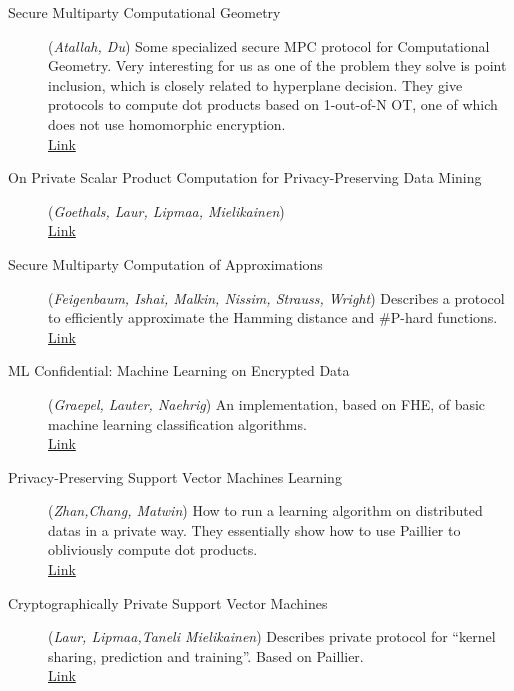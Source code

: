 \documentclass[11pt]{article}
\begin{document}
\begin{description}
	\item[Secure Multiparty Computational Geometry] (\emph{Atallah, Du}) Some specialized secure MPC protocol for Computational Geometry. Very interesting for us as one of the problem they solve is point inclusion, which is closely related to hyperplane decision. They give protocols to compute dot products based on 1-out-of-N OT, one of which does not use homomorphic encryption.
	\\ \href{https://www.cerias.purdue.edu/assets/pdf/bibtex_archive/2001-48.pdf}{Link} 
	
	\item [On Private Scalar Product Computation for Privacy-Preserving Data Mining](\emph{Goethals, Laur, Lipmaa, Mielikainen})
	\\ \href{http://eprints.pascal-network.org/archive/00000295/01/sspfordm.pdf}{Link} 
	
	\item [Secure Multiparty Computation of Approximations](\emph{Feigenbaum, Ishai, Malkin, Nissim, Strauss, Wright}) Describes a protocol to efficiently approximate the Hamming distance and \#P-hard functions.                                               
	\\ \href{http://cs-www.cs.yale.edu/homes/jf/FIMNSW.pdf}{Link}
	
	\item [ML Confidential:	Machine Learning on Encrypted Data](\emph{Graepel, Lauter, Naehrig}) An implementation, based on FHE, of basic machine learning classification algorithms.	   
	\\ \href{http://research.microsoft.com/pubs/179548/323.pdf}{Link}
	  
	\item [Privacy-Preserving Support Vector Machines Learning](\emph{Zhan,Chang, Matwin}) How to run a learning algorithm on distributed datas in a private way. They essentially show how to use Paillier to obliviously compute dot products.
	\\ \href{http://iceb.nccu.edu.tw/proceedings/2005/477-482.pdf}{Link}
	                                            
	\item [Cryptographically Private Support Vector Machines](\emph{Laur, Lipmaa,Taneli Mielikainen}) Describes private protocol for ``kernel sharing, prediction and training''. Based on Paillier.
	\\ \href{http://eprint.iacr.org/2006/198.pdf}{Link}
	

\end{description}
\end{document}
